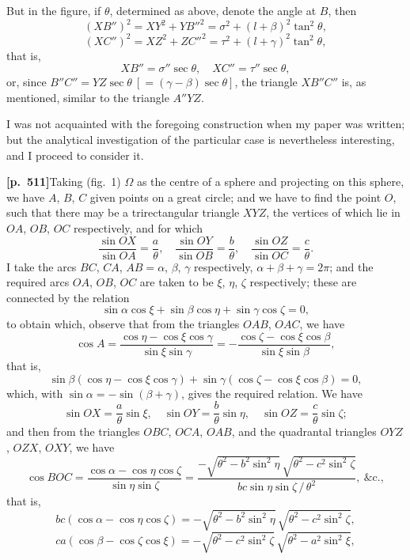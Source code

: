 \documentclass[11pt,a4paper]{article}
\begin{document}
But in the figure, if $\theta$, determined as above, denote the angle at $B$, then
\[
(XB'')^{2} = XY^{2} + YB''^{2} = \sigma^{2} + (l + \beta)^{2}\tan^{2}\theta,
\]
\[
(XC'')^{2} = XZ^{2} + ZC''^{2} = \tau^{2} + (l + \gamma)^{2}\tan^{2}\theta,
\]
that is,
\[
XB'' = \sigma''\sec\theta,\quad XC'' = \tau''\sec\theta,
\]
or, since $B''C'' = YZ\sec\theta\ [= (\gamma - \beta)\sec\theta]$, the triangle $XB''C''$ is, as mentioned, similar to the triangle $A''YZ$.

I was not acquainted with the foregoing construction when my paper was written; but the analytical investigation of the particular case is nevertheless interesting, and I proceed to consider it.

\noindent\textbf{[p.~511]}\quad Taking (fig.~1) $\Omega$ as the centre of a sphere and projecting on this sphere, we have $A$, $B$, $C$ given points on a great circle; and we have to find the point $O$, such that there may be a trirectangular triangle $XYZ$, the vertices of which lie in $OA$, $OB$, $OC$ respectively, and for which
\[
\frac{\sin OX}{\sin OA} = \frac{a}{\theta},\quad \frac{\sin OY}{\sin OB} = \frac{b}{\theta},\quad \frac{\sin OZ}{\sin OC} = \frac{c}{\theta}.
\]
I take the arcs $BC$, $CA$, $AB = \alpha$, $\beta$, $\gamma$ respectively, $\alpha + \beta + \gamma = 2\pi$; and the required arcs $OA$, $OB$, $OC$ are taken to be $\xi$, $\eta$, $\zeta$ respectively; these are connected by the relation
\[
\sin\alpha\cos\xi + \sin\beta\cos\eta + \sin\gamma\cos\zeta = 0,
\]
to obtain which, observe that from the triangles $OAB$, $OAC$, we have
\[
\cos A = \frac{\cos\eta - \cos\xi\cos\gamma}{\sin\xi\sin\gamma} = -\frac{\cos\zeta - \cos\xi\cos\beta}{\sin\xi\sin\beta},
\]
that is,
\[
\sin\beta(\cos\eta - \cos\xi\cos\gamma) + \sin\gamma(\cos\zeta - \cos\xi\cos\beta) = 0,
\]
which, with $\sin\alpha = -\sin(\beta + \gamma)$, gives the required relation. We have
\[
\sin OX = \frac{a}{\theta}\sin\xi,\quad \sin OY = \frac{b}{\theta}\sin\eta,\quad \sin OZ = \frac{c}{\theta}\sin\zeta;
\]
and then from the triangles $OBC$, $OCA$, $OAB$, and the quadrantal triangles $OYZ$, $OZX$, $OXY$, we have
\[
\cos BOC = \frac{\cos\alpha - \cos\eta\cos\zeta}{\sin\eta\sin\zeta} = \frac{-\sqrt{\theta^{2} - b^{2}\sin^{2}\eta}\,\sqrt{\theta^{2} - c^{2}\sin^{2}\zeta}}{bc\sin\eta\sin\zeta\,/\,\theta^{2}},\ \&\text{c.},
\]
that is,
\[
bc(\cos\alpha - \cos\eta\cos\zeta) = -\sqrt{\theta^{2} - b^{2}\sin^{2}\eta}\,\sqrt{\theta^{2} - c^{2}\sin^{2}\zeta},
\]
\[
ca(\cos\beta - \cos\zeta\cos\xi) = -\sqrt{\theta^{2} - c^{2}\sin^{2}\zeta}\,\sqrt{\theta^{2} - a^{2}\sin^{2}\xi},
\]
\end{document}
